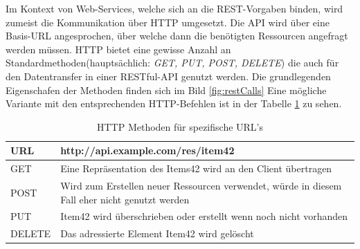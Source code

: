 \documentclass[fleqn,10pt,ngerman]{SelfArx}
\begin{document}
Im Kontext von Web-Services, welche sich an die REST-Vorgaben binden, wird zumeist die Kommunikation über HTTP umgesetzt. Die API wird über eine Basis-URL angesprochen, über welche dann die benötigten Ressourcen angefragt werden müssen. HTTP bietet eine gewisse Anzahl an Standardmethoden(hauptsächlich: \textit{GET, PUT, POST, DELETE}) die auch für den Datentransfer in einer RESTful-API genutzt werden. Die grundlegenden Eigenschafen der Methoden finden sich im Bild \ref{fig:restCalls} Eine mögliche Variante mit den entsprechenden HTTP-Befehlen ist in der Tabelle \ref{tab:httptable} zu sehen.

\begin{table}[hbt]
	\caption{HTTP Methoden für spezifische URL's}
	\centering
	\begin{tabular}{ |p{2cm}|p{5.5cm}|}
		\toprule
		\cmidrule(r){1-2}
		URL & \textbf{http://api.example.com/res/item42}\\
		\midrule
		GET & Eine Repräsentation des Items42 wird an den Client übertragen\\
		\midrule
		POST & Wird zum Erstellen neuer Ressourcen verwendet, würde in diesem Fall eher nicht genutzt werden\\
		\midrule
		PUT & Item42 wird überschrieben oder erstellt wenn noch nicht vorhanden\\
		\midrule
		DELETE & Das adressierte Element Item42 wird gelöscht\\
		\bottomrule
	\end{tabular}\\
	\label{tab:httptable}
\end{table}
\end{document}
